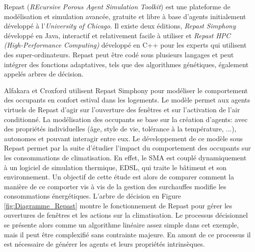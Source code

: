 Repast (\textit{REcursive Porous Agent Simulation Toolkit}) est une plateforme de modélisation et simulation avancée, gratuite et libre à base d'agents initialement développé à l'\textit{University of Chicago}. Il existe deux éditions, \textit{Repast Simphony} développé en Java, interactif et relativement facile à utiliser et \textit{Repast HPC (High-Performance Computing)} développé en C++ pour les experts qui utilisent des super-ordinateurs. Repast peut être codé sous plusieurs langages et peut intégrer des fonctions adaptatives, tels que des algorithmes génétiques, également appelés arbres de décision.


Alfakara et Croxford \cite{Alfakara-14} utilisent Repast Simphony pour modéliser le comportement des occupants en confort estival dans les logements. Le modèle permet aux agents virtuels de Repast d'agir sur l'ouverture des fenêtres et sur l'activation de l'air conditionné. La modélisation des occupants se base sur la création d'agents: avec des propriétés individuelles (âge, style de vie, tolérance à la température, ...), autonomes et pouvant interagir entre eux. Le développement de ce modèle sous Repast permet par la suite d'étudier l'impact du comportement des occupants sur les consommations de climatisation. En effet, le SMA est couplé dynamiquement à un logiciel de simulation thermique, EDSL, qui traite le bâtiment et son environnement. Un objectif de cette étude est alors de comparer comment la manière de ce comporter vis à vis de la gestion des surchauffes modifie les consommations énergétiques. L'arbre de décision en Figure \ref{fig:Diagramme_Repast} montre le fonctionnement de Repast pour gérer les ouvertures de fenêtres et les actions sur la climatisation. Le processus décisionnel se présente alors comme un algorithme linéaire assez simple dans cet exemple, mais il peut être complexifié sans contrainte majeure. En amont de ce processus il est nécessaire de générer les agents et leurs propriétés intrinsèques.

